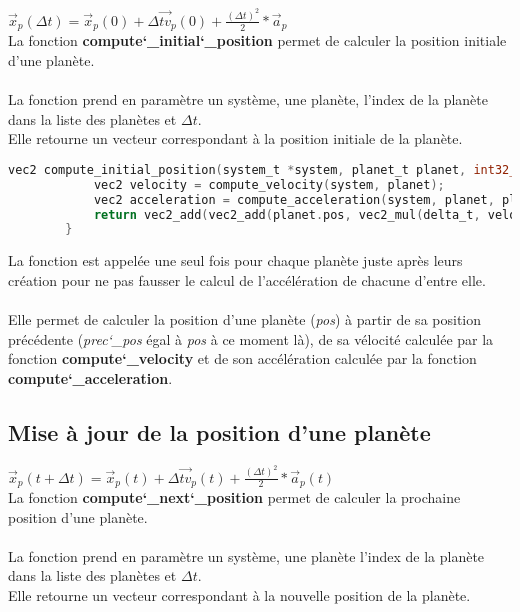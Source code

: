 \documentclass[a4paper,10pt]{article}
\begin{document}
    $\vec{x}_{p}(\Delta{}t) = \vec{x}_{p}(0) + \Delta{}\vec{tv}_{p}(0) + \frac{(\Delta{}t)^{2}}{2} * \vec{a}_{p}$\\

    La fonction \textbf{compute\char`_initial\char`_position} permet de calculer la position initiale d'une planète.\\\\
    La fonction prend en paramètre un système, une planète, l'index de la planète dans la liste des planètes et $\Delta{}t$.\\
    Elle retourne un vecteur correspondant à la position initiale de la planète.

    \begin{lstlisting}[language=c,label={lst:lstlisting5}]
        vec2 compute_initial_position(system_t *system, planet_t planet, int32_t planet_index, double delta_t) {
            vec2 velocity = compute_velocity(system, planet);
            vec2 acceleration = compute_acceleration(system, planet, planet_index);
            return vec2_add(vec2_add(planet.pos, vec2_mul(delta_t, velocity)), vec2_mul(pow(delta_t, 2) / 2, acceleration));
        }
    \end{lstlisting}

    La fonction est appelée une seul fois pour chaque planète juste après leurs création pour ne pas fausser le calcul de l'accélération de chacune d'entre elle.\\\\
    Elle permet de calculer la position d'une planète (\emph{pos}) à partir de sa position précédente (\emph{prec\char`_pos} égal à \emph{pos} à ce moment là), de sa vélocité calculée par la fonction \textbf{compute\char`_velocity} et de son accélération calculée par la fonction \textbf{compute\char`_acceleration}.
    
    \subsection{Mise à jour de la position d'une planète}\label{subsec:mise-à-jour-de-la-position-d'une-planète}

    $\vec{x}_{p}(t + \Delta{}t) = \vec{x}_{p}(t) + \Delta{}\vec{tv}_{p}(t) + \frac{(\Delta{}t)^{2}}{2} * \vec{a}_{p}(t)$\\
    
    La fonction \textbf{compute\char`_next\char`_position} permet de calculer la prochaine position d'une planète.\\\\
    La fonction prend en paramètre un système, une planète l'index de la planète dans la liste des planètes et $\Delta{}t$.\\
    Elle retourne un vecteur correspondant à la nouvelle position de la planète.
\end{document}
